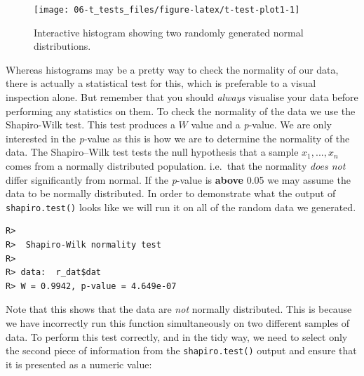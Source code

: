 \documentclass[english,10pt,a4paper,oneside]{book}
\newenvironment{Shaded}{\begin{snugshade}}{\end{snugshade}}
\newcommand{\KeywordTok}[1]{\textcolor[rgb]{0.13,0.29,0.53}{\textbf{#1}}}
\newcommand{\DataTypeTok}[1]{\textcolor[rgb]{0.13,0.29,0.53}{#1}}
\newcommand{\DecValTok}[1]{\textcolor[rgb]{0.00,0.00,0.81}{#1}}
\newcommand{\StringTok}[1]{\textcolor[rgb]{0.31,0.60,0.02}{#1}}
\newcommand{\CommentTok}[1]{\textcolor[rgb]{0.56,0.35,0.01}{\textit{#1}}}
\newcommand{\OperatorTok}[1]{\textcolor[rgb]{0.81,0.36,0.00}{\textbf{#1}}}
\newcommand{\NormalTok}[1]{#1}
\theoremstyle{definition}
\theoremstyle{definition}
\theoremstyle{definition}
\theoremstyle{remark}
\begin{document}
\begin{figure}
\texttt{[image: 06-t\_tests\_files/figure-latex/t-test-plot1-1]} \caption{Interactive histogram showing two randomly generated normal distributions.}\label{fig:t-test-plot1}
\end{figure}

Whereas histograms may be a pretty way to check the normality of our
data, there is actually a statistical test for this, which is preferable
to a visual inspection alone. But remember that you should \emph{always}
visualise your data before performing any statistics on them. To check
the normality of the data we use the Shapiro-Wilk test. This test
produces a \(W\) value and a \emph{p}-value. We are only interested in
the \emph{p}-value as this is how we are to determine the normality of
the data. The Shapiro--Wilk test tests the null hypothesis that a sample
\(x_{1},..., x_{n}\) comes from a normally distributed population.
i.e.~that the normality \emph{does not} differ significantly from
normal. If the \emph{p}-value is \textbf{above} 0.05 we may assume the
data to be normally distributed. In order to demonstrate what the output
of \texttt{shapiro.test()} looks like we will run it on all of the
random data we generated.

\begin{Shaded}
\end{Shaded}

\begin{verbatim}
R> 
R>  Shapiro-Wilk normality test
R> 
R> data:  r_dat$dat
R> W = 0.9942, p-value = 4.649e-07
\end{verbatim}

Note that this shows that the data are \emph{not} normally distributed.
This is because we have incorrectly run this function simultaneously on
two different samples of data. To perform this test correctly, and in
the tidy way, we need to select only the second piece of information
from the \texttt{shapiro.test()} output and ensure that it is presented
as a numeric value:

\begin{Shaded}
\end{Shaded}
\end{document}
